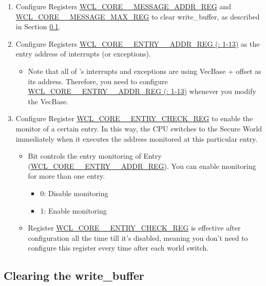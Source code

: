 \documentclass[main\_\_EN.tex]{subfiles}
\begin{document}
\begin{enumerate}
    \item Configure Registers \hyperref[regdesc:WCLCORE0MESSAGEADDRREG]{WCL\_CORE\_\_MESSAGE\_ADDR\_REG} and \hyperref[regdesc:WCLCORE0MESSAGEMAXREG]{WCL\_CORE\_\_MESSAGE\_MAX\_REG} to clear write\_buffer, as described in Section \ref{sec:wctrl-writer-buffer}.
    \item Configure Registers \hyperref[regdesc:WCLCORE0ENTRYnADDRREG]{WCL\_CORE\_\_ENTRY\_\_ADDR\_REG (: 1-13)} as the entry address of interrupts (or exceptions).
    \begin{itemize}
        \item Note that all of \chipname{}'s interrupts and exceptions are using VecBase + offset as its address. Therefore, you need to configure \hyperref[regdesc:WCLCORE0ENTRYnADDRREG]{WCL\_CORE\_\_ENTRY\_\_ADDR\_REG (: 1-13)} whenever you modify the VecBase.
    \end{itemize}
    \item Configure Register \hyperref[regdesc:WCLCORE0ENTRYCHECKREG]{WCL\_CORE\_\_ENTRY\_CHECK\_REG} to enable the monitor of a certain entry. In this way, the CPU switches to the Secure World immediately when it executes the address monitored at this particular entry.
    \begin{itemize}
        \item Bit  controls the entry monitoring of Entry  (\hyperref[regdesc:WCLCORE0ENTRYnADDRREG]{WCL\_CORE\_\_ENTRY\_\_ADDR\_REG}). You can enable monitoring for more than one entry.
        \begin{itemize}
            \item 0: Disable monitoring
            \item 1: Enable monitoring
        \end{itemize}
        \item Register \hyperref[regdesc:WCLCORE0ENTRYCHECKREG]{WCL\_CORE\_\_ENTRY\_CHECK\_REG} is effective after configuration all the time till it's disabled, meaning you don't need to configure this register every time after each world switch.
    \end{itemize}
\end{enumerate}
\subsection{Clearing the write\_buffer}\label{sec:wctrl-writer-buffer}
\end{document}
